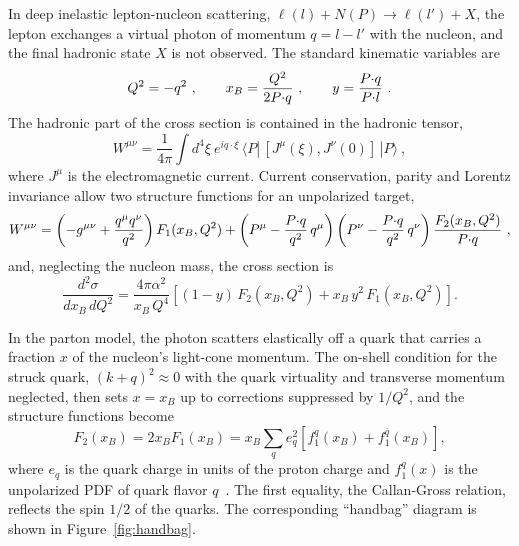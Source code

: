 In deep inelastic lepton-nucleon scattering, $\ell(l) + N(P) \to \ell(l') + X$, the lepton exchanges a virtual photon of momentum $q = l - l'$ with the nucleon, and the final hadronic state $X$ is not observed. The standard kinematic variables are
\begin{equation}
  Q^2 = -q^2 \ ,\qquad x_B = \frac{Q^2}{2P{\cdot} q} \ ,\qquad y = \frac{P{\cdot} q}{P{\cdot} l} \ .
\end{equation}
The hadronic part of the cross section is contained in the hadronic tensor,
\begin{equation}
  W^{\mu\nu} = \frac{1}{4\pi}\int d^4\xi\ e^{iq\cdot\xi}\,\langle P|\,[J^\mu(\xi),J^\nu(0)]\,|P\rangle \ ,
\end{equation}
where $J^\mu$ is the electromagnetic current. Current conservation, parity and Lorentz invariance allow two structure functions for an unpolarized target,
\begin{equation}
  W^{\mu\nu} = \left(-g^{\mu\nu} + \frac{q^\mu q^\nu}{q^2}\right) F_1(x_B,Q^2)
  + \left(P^\mu - \frac{P\tcdot q}{q^2}\,q^\mu\right)\left(P^\nu - \frac{P\tcdot q}{q^2}\,q^\nu\right)\frac{F_2(x_B,Q^2)}{P\tcdot q} \ ,
\end{equation}
and, neglecting the nucleon mass, the cross section is
\begin{equation}
  \frac{d^2\sigma}{dx_B\,dQ^2} = \frac{4\pi\alpha^2}{x_B\,Q^4}\left[(1-y)\,F_2(x_B,Q^2) + x_B\,y^2\,F_1(x_B,Q^2)\right] .
\end{equation}

In the parton model, the photon scatters elastically off a quark that carries a fraction $x$ of the nucleon's light-cone momentum. The on-shell condition for the struck quark, $(k+q)^2\approx 0$ with the quark virtuality and transverse momentum neglected, then sets $x = x_B$ up to corrections suppressed by $1/Q^2$, and the structure functions become
\begin{equation}
  F_2(x_B) = 2x_B F_1(x_B) = x_B\sum_q e_q^2\left[f_1^q(x_B) + f_1^{\bar q}(x_B)\right] ,
  \label{eq:parton_model_F2}
\end{equation}
where $e_q$ is the quark charge in units of the proton charge and $f_1^q(x)$ is the unpolarized PDF of quark flavor $q$~\cite{Feynman:1969ej,Bjorken:1968dy,Callan:1969uq}. The first equality, the Callan-Gross relation, reflects the spin $1/2$ of the quarks. The corresponding ``handbag'' diagram is shown in Figure~\ref{fig:handbag}.

